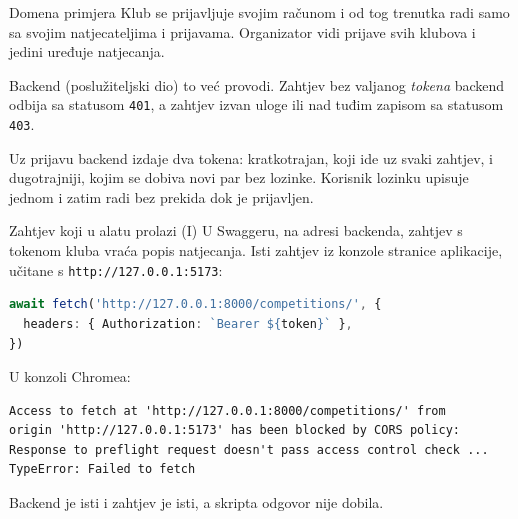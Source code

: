 \begin{frame}{Domena primjera}
Klub se prijavljuje svojim računom i od tog trenutka radi samo sa svojim natjecateljima i prijavama. Organizator vidi prijave svih klubova i jedini uređuje natjecanja.

\vspace{0.9em}
Backend (poslužiteljski dio) to već provodi. Zahtjev bez valjanog \emph{tokena} backend odbija sa statusom \texttt{401}, a zahtjev izvan uloge ili nad tuđim zapisom sa statusom \texttt{403}.

\vspace{0.9em}
Uz prijavu backend izdaje dva tokena: kratkotrajan, koji ide uz svaki zahtjev, i dugotrajniji, kojim se dobiva novi par bez lozinke. Korisnik lozinku upisuje jednom i zatim radi bez prekida dok je prijavljen.
\end{frame}

\begin{frame}[fragile]{Zahtjev koji u alatu prolazi (I)}
U Swaggeru, na adresi backenda, zahtjev s tokenom kluba vraća popis natjecanja. Isti zahtjev iz konzole stranice aplikacije, učitane s \texttt{http://127.0.0.1:5173}:

\begin{lstlisting}[language=typescript]
await fetch('http://127.0.0.1:8000/competitions/', {
  headers: { Authorization: `Bearer ${token}` },
})
\end{lstlisting}

\vspace{0.2em}
U konzoli Chromea:

\begin{lstlisting}
Access to fetch at 'http://127.0.0.1:8000/competitions/' from
origin 'http://127.0.0.1:5173' has been blocked by CORS policy:
Response to preflight request doesn't pass access control check ...
TypeError: Failed to fetch
\end{lstlisting}

\vspace{0.2em}
Backend je isti i zahtjev je isti, a skripta odgovor nije dobila.
\end{frame}

